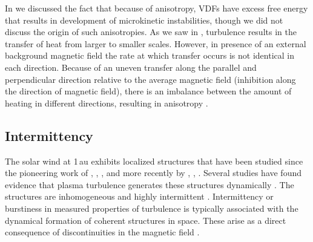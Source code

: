             In  we discussed the fact that because of anisotropy, VDFs have excess
            free energy that results in development of microkinetic instabilities, though we did not
            discuss the origin of such anisotropies. As we saw in , turbulence results
            in the transfer of heat from larger to smaller scales. However, in presence of an
            external background magnetic field the rate at which transfer occurs is not identical in
            each direction. Because of an uneven transfer along the parallel and perpendicular
            direction relative to the average magnetic field (inhibition along the direction of
            magnetic field), there is an imbalance between the amount of heating in different
            directions, resulting in anisotropy \citep{Shebalin1983,Oughton1994}.

        \subsection{Intermittency}\label{sec:intmt}

            The solar wind at 1\,au exhibits localized structures that have been studied since the
            pioneering work of \citet{Burlaga1968}, \citet{Hudson1970}, \citet{Tsurutani1979}, and
            more recently by \citet{Ness2001}, \citet{Neugebauer2006}, \citet{ErdHoS2008}. Several
            studies have found evidence that plasma turbulence generates these structures
            dynamically \citep{Matthaeus1986, Veltri1999, Osman2013}. The structures are
            inhomogeneous and highly intermittent \citep{Osman2011, Osman2013,Greco2008}.
            Intermittency or burstiness in measured properties of turbulence is typically associated
            with the dynamical formation of coherent structures in space. These arise as a direct
            consequence of discontinuities in the magnetic field
            \citep{Greco2008,Greco2009,Vasquez2007}.

